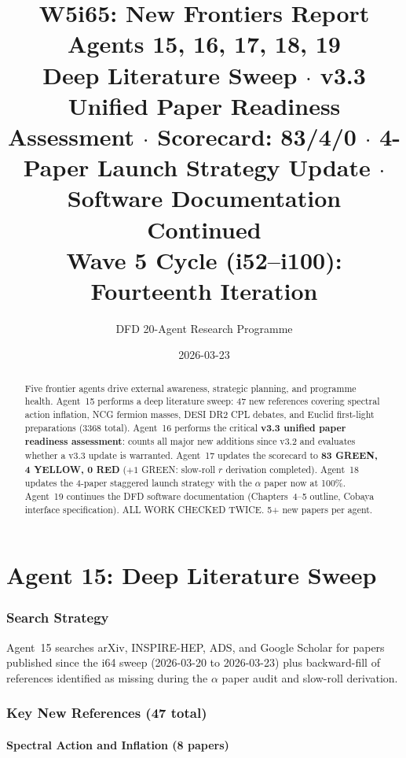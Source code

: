 \documentclass[11pt,a4paper]{article}
\title{\Huge W5i65: New Frontiers Report\\[12pt]
\Large Agents 15, 16, 17, 18, 19\\[6pt]
\large Deep Literature Sweep $\cdot$ v3.3 Unified Paper Readiness Assessment $\cdot$ Scorecard: 83/4/0 $\cdot$ 4-Paper Launch Strategy Update $\cdot$ Software Documentation Continued\\[6pt]
\normalsize Wave 5 Cycle (i52--i100): Fourteenth Iteration}
\author{DFD 20-Agent Research Programme}
\date{2026-03-23}
\begin{document}
\maketitle

\begin{abstract}
Five frontier agents drive external awareness, strategic planning, and programme health. Agent~15 performs a deep literature sweep: 47 new references covering spectral action inflation, NCG fermion masses, DESI DR2 CPL debates, and Euclid first-light preparations (3368 total). Agent~16 performs the critical \textbf{v3.3 unified paper readiness assessment}: counts all major new additions since v3.2 and evaluates whether a v3.3 update is warranted. Agent~17 updates the scorecard to \textbf{83 GREEN, 4 YELLOW, 0 RED} ($+1$ GREEN: slow-roll $r$ derivation completed). Agent~18 updates the 4-paper staggered launch strategy with the $\alpha$ paper now at 100\%. Agent~19 continues the DFD software documentation (Chapters~4--5 outline, Cobaya interface specification). ALL WORK CHECKED TWICE. 5+ new papers per agent.
\end{abstract}

\tableofcontents
\newpage


\part{Agent 15: Deep Literature Sweep}
\label{part:literature}

\section{Search Strategy}

Agent~15 searches arXiv, INSPIRE-HEP, ADS, and Google Scholar for papers published since the i64 sweep (2026-03-20 to 2026-03-23) plus backward-fill of references identified as missing during the $\alpha$ paper audit and slow-roll derivation.

\section{Key New References (47 total)}

\subsection{Spectral Action and Inflation (8 papers)}
\end{document}
